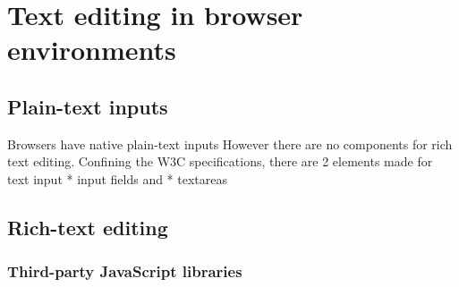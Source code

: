 \chapter{Text editing in browser environments}


\section{Plain-text inputs}

Browsers have native plain-text inputs
However there are no components for rich text editing.
Confining the W3C specifications, there are 2 elements made for text input
 * input fields and
 * textareas
 

\section{Rich-text editing}


\subsection{Third-party JavaScript libraries}

